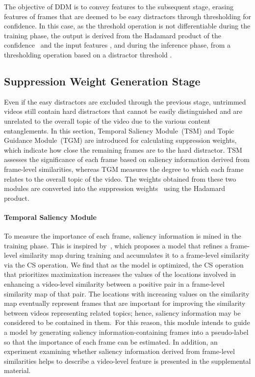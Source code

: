\documentclass[10pt,twocolumn,letterpaper]{article}
\begin{document}
            The objective of DDM is to convey features to the subsequent stage, erasing features of frames that are deemed to be easy distractors through thresholding for confidence. In this case, as the threshold operation is not differentiable during the training phase, the output is derived from the Hadamard product of the confidence~ and the input features , and during the inference phase, from a thresholding operation based on a distractor threshold .
        

        
    \subsection{Suppression Weight Generation Stage}
        
        Even if the easy distractors are excluded through the previous stage, untrimmed videos still contain hard distractors that cannot be easily distinguished and are unrelated to the overall topic of the video due to the various content entanglements. In this section, Temporal Saliency Module~(TSM) and Topic Guidance Module~(TGM) are introduced for calculating suppression weights, which indicate how close the remaining frames are to the hard distractor. TSM assesses the significance of each frame based on saliency information derived from frame-level similarities, whereas TGM measures the degree to which each frame relates to the overall topic of the video. The weights obtained from these two modules are converted into the suppression weights~ using the Hadamard product.
        \vspace{-2mm}
        
        \paragraph{Temporal Saliency Module \\} 
            To measure the importance of each frame, saliency information is mined in the training phase. This is inspired by~\cite{kordopatis2019visil}, which proposes a model that refines a frame-level similarity map during training and accumulates it to a frame-level similarity via the CS operation. We find that as the model is optimized, the CS operation that prioritizes maximization increases the values of the locations involved in enhancing a video-level similarity between a positive pair in a frame-level similarity map of that pair. The locations with increasing values on the similarity map eventually represent frames that are important for improving the similarity between videos representing related topics; hence, saliency information may be considered to be contained in them. For this reason, this module intends to guide a model by generating saliency information-containing frames into a pseudo-label so that the importance of each frame can be estimated. In addition, an experiment examining whether saliency information derived from frame-level similarities helps to describe a video-level feature is presented in the supplemental material.
\end{document}
